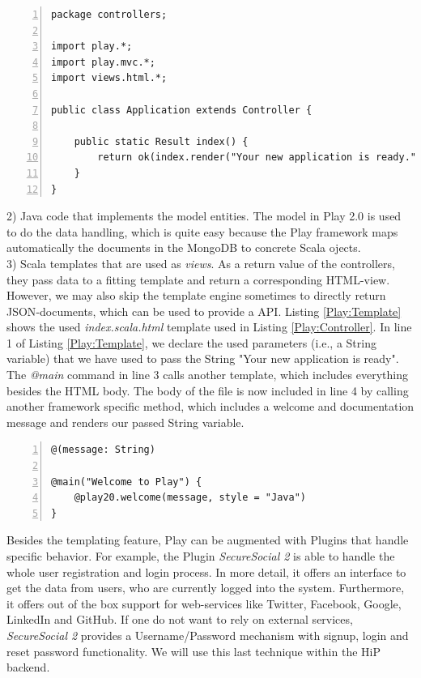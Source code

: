 \begin{lstlisting}[numbers=left,caption={Simple Java-controller within the Play Framework},label=Play:Controller,frame=tlbr,breaklines]
package controllers;

import play.*;
import play.mvc.*;
import views.html.*;

public class Application extends Controller {

    public static Result index() {
        return ok(index.render("Your new application is ready."));
    }
}
\end{lstlisting}

2) Java code that implements the model entities. The model in Play 2.0 is used to do the data handling, which is quite easy because the Play framework maps automatically the documents in the MongoDB to concrete Scala ojects. \\
3) Scala templates that are used as \textit{views}. As a return value of the controllers, they pass data to a fitting template and return a corresponding \ac{HTML}-view. However, we may also skip the template engine sometimes to directly return \ac{JSON}-documents, which can be used to provide a \ac{API}. Listing \ref{Play:Template} shows the used \textit{index.scala.html} template used in Listing \ref{Play:Controller}. In line 1 of Listing \ref{Play:Template}, we declare the used parameters (i.e., a String variable) that we have used to pass the String "Your new application is ready". The \textit{@main} command in line 3 calls another template, which includes everything besides the \ac{HTML} body. The body of the file is now included in line 4 by calling another framework specific method, which includes a welcome and documentation message and renders our passed String variable.

\begin{lstlisting}[numbers=left,caption={Simple Scala template within the Play Framework},label=Play:Template,frame=tlbr,breaklines]
@(message: String)

@main("Welcome to Play") {
    @play20.welcome(message, style = "Java")
}
\end{lstlisting}

Besides the templating feature, Play can be augmented with Plugins that handle specific behavior. For example, the Plugin \emph{SecureSocial 2} is able to handle the whole user registration and login process. In more detail, it offers an interface to get the data from users, who are currently logged into the system. Furthermore, it offers out of the box support for web-services like Twitter, Facebook, Google, LinkedIn and GitHub. If one do not want to rely on external services, \emph{SecureSocial 2} provides a Username/Password mechanism with signup, login and reset password functionality. We will use this last technique within the \ac{HiP} backend.

